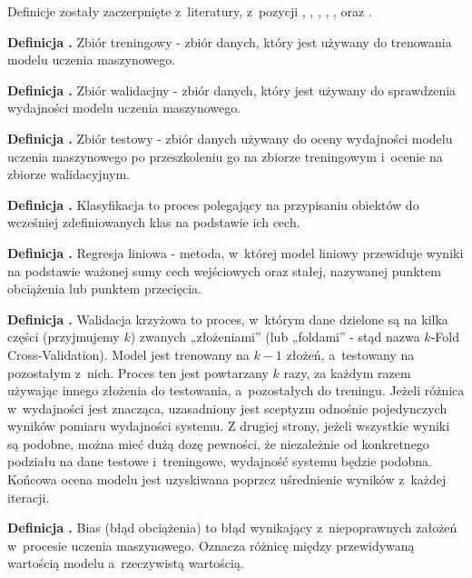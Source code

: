 Definicje zostały zaczerpnięte z~literatury, z~pozycji \cite{Fenner2020}, \cite{Geron2020},
\cite{Seenappa} , \cite{Goodfellow2016}, \cite{vanDerMaaten}, \cite{strGoogle} oraz \cite{strIbm}.

\noindent
\textbf{Definicja .}
\incrementdefinitionIndex
Zbiór treningowy - zbiór danych, który jest używany do trenowania modelu uczenia maszynowego.

\noindent
\textbf{Definicja .}
\incrementdefinitionIndex
Zbiór walidacjny - zbiór danych, który jest używany do sprawdzenia wydajności modelu uczenia maszynowego.

\noindent
\textbf{Definicja .}
\incrementdefinitionIndex
Zbiór testowy - zbiór danych używany do oceny wydajności modelu uczenia maszynowego
po przeszkoleniu go na zbiorze treningowym i~ocenie na zbiorze walidacyjnym.

\noindent
\textbf{Definicja .}
\incrementdefinitionIndex
Klasyfikacja to proces polegający na przypisaniu obiektów do wcześniej zdefiniowanych klas na podstawie ich cech.

\noindent
\textbf{Definicja .}
\incrementdefinitionIndex
Regresja liniowa - metoda, w~której model liniowy przewiduje wyniki na podstawie ważonej sumy cech wejściowych oraz stałej,
nazywanej punktem obciążenia lub punktem przecięcia.

\noindent
\textbf{Definicja .}
\incrementdefinitionIndex
Walidacja krzyżowa to proces, w~którym dane dzielone są na kilka części (przyjmujemy $k$) zwanych „złożeniami”
(lub „foldami” - stąd nazwa $k$-Fold Cross-Validation). Model jest trenowany na $k-1$ złożeń, a~testowany na pozostałym z~nich.
Proces ten jest powtarzany $k$ razy, za każdym razem używając innego złożenia do testowania, a~pozostałych do treningu.
Jeżeli różnica w~wydajności jest znacząca, uzasadniony jest sceptyzm odnośnie pojedynczych wyników pomiaru wydajności systemu.
Z drugiej strony, jeżeli wszystkie wyniki są podobne, można mieć dużą dozę pewności, że niezależnie od konkretnego podziału
na dane testowe i~treningowe, wydajność systemu będzie podobna.
Końcowa ocena modelu jest uzyskiwana poprzez uśrednienie wyników z~każdej iteracji.

\noindent
\textbf{Definicja .}
\incrementdefinitionIndex
Bias (błąd obciążenia) to błąd wynikający z~niepoprawnych założeń w~procesie uczenia maszynowego.
Oznacza różnicę między przewidywaną wartością modelu a~rzeczywistą wartością.

